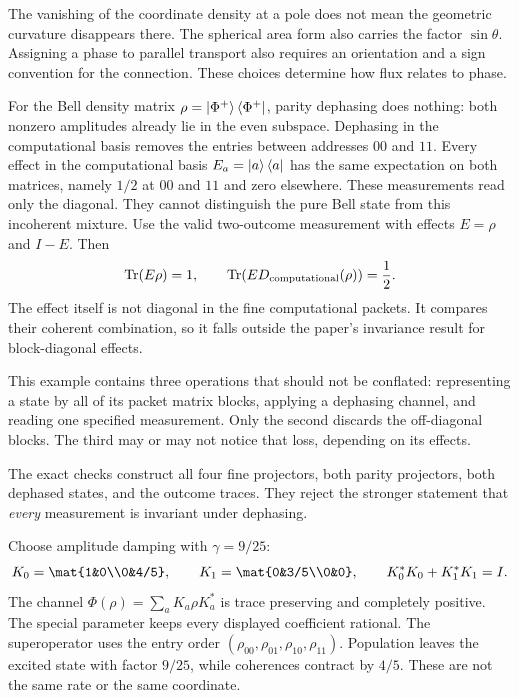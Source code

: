 The vanishing of the coordinate density at a pole does not mean the geometric curvature disappears there. The spherical area form also carries the factor $\sin\theta$. Assigning a phase to parallel transport also requires an orientation and a sign convention for the connection. These choices determine how flux relates to phase.

For the Bell density matrix $\rho=\left|\Phi^+\right\rangle\left\langle\Phi^+\right|$, parity dephasing does nothing: both nonzero amplitudes already lie in the even subspace. Dephasing in the computational basis removes the entries between addresses $00$ and $11$.
Every effect in the computational basis $E_a=\left|a\right\rangle\left\langle a\right|$ has the same expectation on both matrices, namely $1/2$ at $00$ and $11$ and zero elsewhere. These measurements read only the diagonal. They cannot distinguish the pure Bell state from this incoherent mixture.
Use the valid two-outcome measurement with effects $E=\rho$ and $I-E$. Then
\[
\operatorname{Tr}(E\rho)=1,\qquad
\operatorname{Tr}\!\left(E D_{\rm computational}(\rho)\right)=\frac12.
\]
The effect itself is not diagonal in the fine computational packets. It compares their coherent combination, so it falls outside the paper's invariance result for block-diagonal effects.

This example contains three operations that should not be conflated: representing a state by all of its packet matrix blocks, applying a dephasing channel, and reading one specified measurement. Only the second discards the off-diagonal blocks. The third may or may not notice that loss, depending on its effects.

The exact checks construct all four fine projectors, both parity projectors, both dephased states, and the outcome traces. They reject the stronger statement that \emph{every} measurement is invariant under dephasing.

Choose amplitude damping with $\gamma=9/25$:
\[
K_0=\mat{1&0\\0&4/5},\qquad
K_1=\mat{0&3/5\\0&0},\qquad K_0^*K_0+K_1^*K_1=I.
\]
The channel $\Phi(\rho)=\sum_aK_a\rho K_a^*$ is trace preserving and completely positive. The special parameter keeps every displayed coefficient rational.
The superoperator uses the entry order $(\rho_{00},\rho_{01},\rho_{10},\rho_{11})$. Population leaves the excited state with factor $9/25$, while coherences contract by $4/5$. These are not the same rate or the same coordinate.

